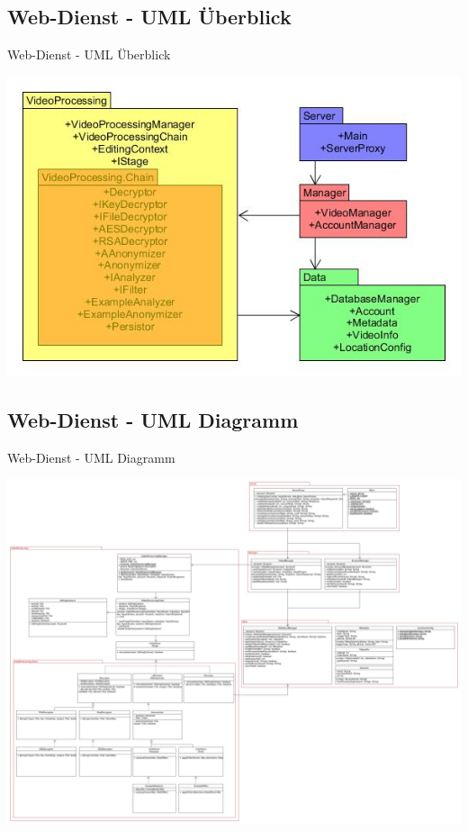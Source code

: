 \documentclass[19pt]{beamer}
\begin{document}
\subsection{Web-Dienst - UML \"{U}berblick}
\begin{frame}{Web-Dienst - UML \"{U}berblick}
\begin{center}
\includegraphics[scale=0.5]{resources/modules_overview_service.jpg}
\end{center}
\end{frame}
\subsection{Web-Dienst - UML Diagramm}
\begin{frame}{Web-Dienst - UML Diagramm}
\begin{center}
\includegraphics[scale=0.093]{resources/UMLSERVERPCC.jpg}
\end{center}
\end{frame}
\end{document}
